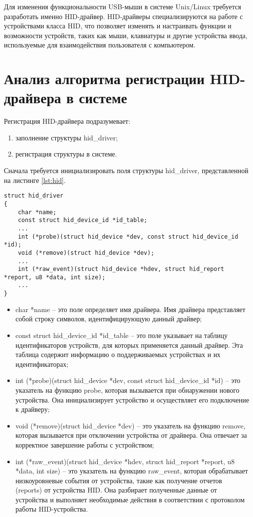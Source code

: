 \documentclass{bmstu}
\begin{document}
Для изменения функциональности USB-мыши в системе Unix/Linux требуется разработать именно HID-драйвер. HID-драйверы специализируются на работе с устройствами класса HID, что позволяет изменять и настраивать функции и возможности устройств, таких как мыши, клавиатуры и другие устройства ввода, используемые для взаимодействия пользователя с компьютером.

\section{Анализ алгоритма регистрации HID-драйвера в системе}

Регистрация HID-драйвера подразумевает:

\begin{enumerate}
	\item заполнение структуры hid\_driver;
	\item регистрация структуры в системе.
\end{enumerate}

Сначала требуется инициализировать поля структуры hid\_driver, представленной на листинге \ref{lst:hid}.

\begin{lstlisting}[caption={struct hid\_driver}, label=lst:hid]
struct hid_driver
{
    char *name;
    const struct hid_device_id *id_table;
    ...
    int (*probe)(struct hid_device *dev, const struct hid_device_id *id);
    void (*remove)(struct hid_device *dev);
    ...
    int (*raw_event)(struct hid_device *hdev, struct hid_report *report, u8 *data, int size);
    ...
}
\end{lstlisting}

\begin{itemize}
	\item char *name -- это поле определяет имя драйвера. Имя драйвера представляет собой строку символов, идентифицирующую данный драйвер;
	\item const struct hid\_device\_id *id\_table -- это поле указывает на таблицу идентификаторов устройств, для которых применяется данный драйвер. Эта таблица содержит информацию о поддерживаемых устройствах и их идентификаторах;
	\item int (*probe)(struct hid\_device *dev, const struct hid\_device\_id *id) -- это указатель на функцию probe, которая вызывается при обнаружении нового устройства. Она инициализирует устройство и осуществляет его подключение к драйверу;
	\item void (*remove)(struct hid\_device *dev) -- это указатель на функцию remove, которая вызывается при отключении устройства от драйвера. Она отвечает за корректное завершение работы с устройством;
	\item int (*raw\_event)(struct hid\_device *hdev, struct hid\_report *report, u8 *data, int size) -- это указатель на функцию raw\_event, которая обрабатывает низкоуровневые события от устройства, такие как получение отчетов (reports) от устройства HID. Она разбирает полученные данные от устройства и выполняет необходимые действия в соответствии с протоколом работы HID-устройства.
\end{itemize}
\end{document}
